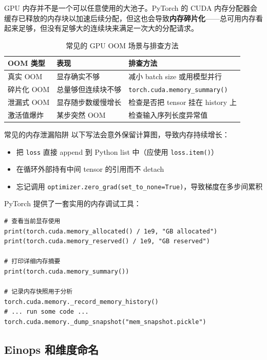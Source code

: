 \documentclass[a4paper]{article}
\begin{document}
GPU 内存并不是一个可以任意使用的大池子。PyTorch 的 CUDA 内存分配器会缓存已释放的内存块以加速后续分配，但这也会导致\textbf{内存碎片化}——总可用内存看起来足够，但没有足够大的连续块来满足一次大的分配请求。

\begin{table}[H]
\centering
\begin{tabular}{p{}p{}p{}}
\toprule
\textbf{OOM 类型} & \textbf{表现} & \textbf{排查方法} \\
\midrule
真实 OOM & 显存确实不够 & 减小 batch size 或用模型并行 \\
碎片化 OOM & 总量够但连续块不够 & \texttt{torch.cuda.memory\_summary()} \\
泄漏式 OOM & 显存随步数缓慢增长 & 检查是否把 tensor 挂在 history 上 \\
激活值爆炸 & 某步突然 OOM & 检查输入序列长度异常值 \\
\bottomrule
\end{tabular}
\caption{常见的 GPU OOM 场景与排查方法}
\end{table}

\begin{warningbox}{常见的内存泄漏陷阱}
以下写法会意外保留计算图，导致内存持续增长：
\begin{itemize}
    \item 把 \texttt{loss} 直接 append 到 Python list 中（应使用 \texttt{loss.item()}）
    \item 在循环外部持有中间 tensor 的引用而不 detach
    \item 忘记调用 \texttt{optimizer.zero\_grad(set\_to\_none=True)}，导致梯度在多步间累积
\end{itemize}
\end{warningbox}

PyTorch 提供了一套实用的内存调试工具：

\begin{lstlisting}[caption={GPU 内存调试常用命令}]
# 查看当前显存使用
print(torch.cuda.memory_allocated() / 1e9, "GB allocated")
print(torch.cuda.memory_reserved() / 1e9, "GB reserved")

# 打印详细内存摘要
print(torch.cuda.memory_summary())

# 记录内存快照用于分析
torch.cuda.memory._record_memory_history()
# ... run some code ...
torch.cuda.memory._dump_snapshot("mem_snapshot.pickle")
\end{lstlisting}

\subsection{Einops 和维度命名}
\end{document}
